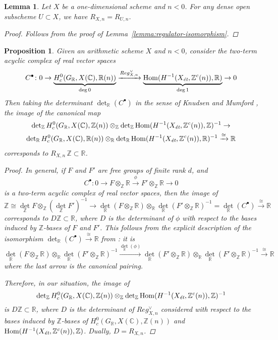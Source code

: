 \documentclass[draft]{article}
\DeclareMathOperator{\Hom}{Hom}
\newcommand{\CC}{\mathbb{C}}
\newcommand{\RR}{\mathbb{R}}
\newcommand{\ZZ}{\mathbb{Z}}
\renewcommand{\det}{\operatorname{det}}
\newcommand{\et}{\text{\it \'{e}t}}
\theoremstyle{myplain}
\newtheorem{proposition}[theorem]{Proposition}
\newtheorem{lemma}[theorem]{Lemma}
\theoremstyle{mydefinition}
\begin{document}
\begin{lemma}
  \label{lemma:regulator-dense-open-subset}
  Let $X$ be a one-dimensional scheme and $n < 0$. For any dense open subscheme
  $U \subset X$, we have $R_{X,n} = R_{U,n}$.

  \begin{proof}
    Follows from the proof of Lemma~\ref{lemma:regulator-isomorphism}.
  \end{proof}
\end{lemma}

\begin{proposition}
  \label{prop:trivialization-of-free-part}
  Given an arithmetic scheme $X$ and $n < 0$, consider the two-term acyclic
  complex of real vector spaces
  \[ C^\bullet\colon
    0 \to
    \underbrace{H^0_c (G_\RR, X(\CC), \RR(n))}_{\deg 0}
    \xrightarrow{Reg_{X,n}^\vee}
    \underbrace{\Hom (H^{-1} (X_\et, \ZZ^c (n)), \RR)}_{\deg 1}
    \to 0 \]
  Then taking the determinant $\det_\RR (C^\bullet)$ in the sense of
  Knudsen and Mumford \cite{Knudsen-Mumford-1976},
  the image of the canonical map
  \begin{multline*}
    \det_\ZZ H^0_c (G_\RR, X(\CC), \ZZ(n)) \otimes_\ZZ
    \det_\ZZ \Hom (H^{-1} (X_\et, \ZZ^c (n)), \ZZ)^{-1} \to \\
    \det_\RR H^0_c (G_\RR, X(\CC), \RR (n)) \otimes_\RR
    \det_\RR \Hom (H^{-1} (X_\et, \ZZ^c (n)), \RR)^{-1}
    \xrightarrow{\cong} \RR
  \end{multline*}
  corresponds to $R_{X,n}\,\ZZ \subset \RR$.

  \begin{proof}
    In general, if $F$ and $F'$ are free groups of finite rank $d$, and
    $$C^\bullet\colon 0 \to F\otimes_\ZZ \RR \xrightarrow{\phi} F'\otimes_\ZZ \RR \to 0$$
    is a two-term acyclic complex of real vector spaces, then the image of
    \[ \ZZ \cong \det_\ZZ F \otimes_\ZZ (\det_\ZZ F')^{-1} \to
      \det_\RR (F\otimes_\ZZ \RR) \otimes_\RR \det_\RR (F' \otimes_\ZZ \RR)^{-1}
      = \det_\RR (C^\bullet) \xrightarrow{\cong} \RR \]
    corresponds to $D\ZZ \subset \RR$, where $D$ is the determinant of $\phi$ with
    respect to the bases induced by $\ZZ$-bases of $F$ and $F'$.
    This follows from the explicit description of the isomorphism
    $\det_\RR (C^\bullet) \xrightarrow{\cong} \RR$ from
    \cite[p.\,33]{Knudsen-Mumford-1976}: it is
    \[ \det_\RR (F \otimes_\ZZ \RR) \otimes_\RR
      \det_\RR (F'\otimes_\ZZ \RR)^{-1} \xrightarrow{\det_\RR (\phi)}
      \det_\RR (F' \otimes_\ZZ \RR) \otimes_\RR
      \det_\RR (F' \otimes_\ZZ \RR)^{-1} \xrightarrow{\cong} \RR \]
    where the last arrow is the canonical pairing.

    Therefore, in our situation, the image of
    \[ \det_\ZZ H^0_c (G_\RR, X(\CC), \ZZ(n)) \otimes_\ZZ
      \det_\ZZ \Hom (H^{-1} (X_\et, \ZZ^c (n)), \ZZ)^{-1} \]
    is $D \ZZ \subset \RR$, where $D$ is the determinant of $Reg_{X,n}^\vee$
    considered with respect to the bases induced by $\ZZ$-bases of
    $H^0_c (G_\RR, X(\CC), \ZZ(n))$ and
    $\Hom (H^{-1} (X_\et, \ZZ^c (n)), \ZZ)$. Dually, $D = R_{X,n}$.
  \end{proof}
\end{proposition}
\end{document}

